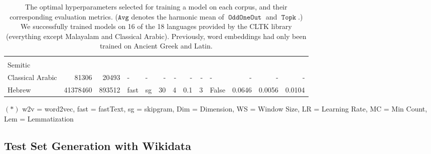 \documentclass[11pt,a4paper]{article}
\DeclareMathOperator{\OddOneOut}{\texttt{OddOneOut}}
\DeclareMathOperator{\topk}{\texttt{Topk}}
\begin{document}
\begin{table}[t]
\begin{tabular}{lrrllrrrrlrrr}
    &&&&&&&&&&&&\\[-4pt]
    Semitic&&&&&&&&&&&&\\
  \quad Classical Arabic & \num{81306} & \num{20493} & - & - & - & - & - & - & - & - & - & - \\
   \quad Hebrew & \num{41378460} & \num{893512} & fast & sg & \num{30} & \num{4} & \num{.1} & \num{3} & False & 0.0646 & 0.0056 & 0.0104\\ 
\bottomrule
\end{tabular}

    \vspace{0.05in}
    $(*)$ w2v = word2vec, fast = fastText, sg = skipgram, Dim = Dimension, WS = Window Size, LR = Learning Rate, MC = Min Count, Lem = Lemmatization

\caption{
    The optimal hyperparameters selected for training a model on each corpus,
    and their corresponding evaluation metrics.
    ($\texttt{Avg}$ denotes the harmonic mean of $\OddOneOut$ and $\topk$.)
    We successfully trained models on 16 of the 18 languages provided by the CLTK library (everything except Malayalam and Classical Arabic).
    Previously, word embeddings had only been trained on Ancient Greek and Latin.
    }
\label{table:language}
\end{table}

\subsection{Test Set Generation with Wikidata}
\label{sec:wikidata}
\end{document}

